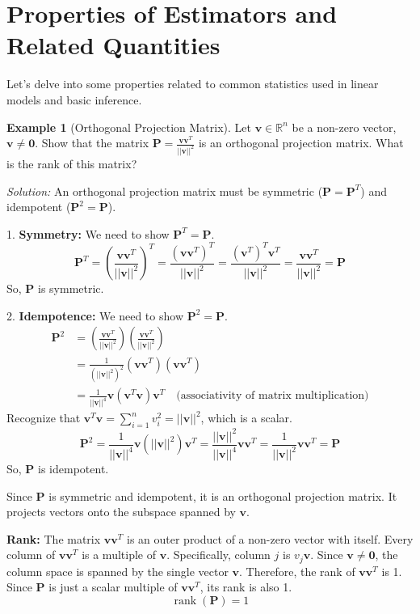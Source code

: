\documentclass[11pt]{article}
\theoremstyle{definition}
\newtheorem{example}[theorem]{Example}
\theoremstyle{remark}
\DeclareMathOperator{\rank}{\operatorname{rank}}
\begin{document}
\section{Properties of Estimators and Related Quantities}

Let's delve into some properties related to common statistics used in linear models and basic inference.

\begin{example}[Orthogonal Projection Matrix] \label{ex:projection}
    Let $\bm{v} \in \mathbb{R}^n$ be a non-zero vector, $\bm{v} \ne \mathbf{0}$. Show that the matrix $\bm{P} = \frac{\bm{v}\bm{v}^T}{||\bm{v}||^2}$ is an orthogonal projection matrix. What is the rank of this matrix?

    \emph{Solution:}
    An orthogonal projection matrix must be symmetric ($\bm{P} = \bm{P}^T$) and idempotent ($\bm{P}^2 = \bm{P}$).
    
    1.  \textbf{Symmetry:} We need to show $\bm{P}^T = \bm{P}$.
        \[ \bm{P}^T = \left( \frac{\bm{v}\bm{v}^T}{||\bm{v}||^2} \right)^T = \frac{(\bm{v}\bm{v}^T)^T}{||\bm{v}||^2} = \frac{(\bm{v}^T)^T \bm{v}^T}{||\bm{v}||^2} = \frac{\bm{v}\bm{v}^T}{||\bm{v}||^2} = \bm{P} \]
        So, $\bm{P}$ is symmetric.
        
    2.  \textbf{Idempotence:} We need to show $\bm{P}^2 = \bm{P}$.
        \begin{align*} \bm{P}^2 &= \left( \frac{\bm{v}\bm{v}^T}{||\bm{v}||^2} \right) \left( \frac{\bm{v}\bm{v}^T}{||\bm{v}||^2} \right) \\ &= \frac{1}{(||\bm{v}||^2)^2} (\bm{v}\bm{v}^T)(\bm{v}\bm{v}^T) \\ &= \frac{1}{||\bm{v}||^4} \bm{v}(\bm{v}^T\bm{v})\bm{v}^T \quad \text{(associativity of matrix multiplication)} \end{align*}
        Recognize that $\bm{v}^T\bm{v} = \sum_{i=1}^n v_i^2 = ||\bm{v}||^2$, which is a scalar.
        \[ \bm{P}^2 = \frac{1}{||\bm{v}||^4} \bm{v}(||\bm{v}||^2)\bm{v}^T = \frac{||\bm{v}||^2}{||\bm{v}||^4} \bm{v}\bm{v}^T = \frac{1}{||\bm{v}||^2} \bm{v}\bm{v}^T = \bm{P} \]
        So, $\bm{P}$ is idempotent.
        
    Since $\bm{P}$ is symmetric and idempotent, it is an orthogonal projection matrix. It projects vectors onto the subspace spanned by $\bm{v}$.

    \textbf{Rank:} The matrix $\bm{v}\bm{v}^T$ is an outer product of a non-zero vector with itself. Every column of $\bm{v}\bm{v}^T$ is a multiple of $\bm{v}$. Specifically, column $j$ is $v_j \bm{v}$. Since $\bm{v} \ne \mathbf{0}$, the column space is spanned by the single vector $\bm{v}$. Therefore, the rank of $\bm{v}\bm{v}^T$ is 1. Since $\bm{P}$ is just a scalar multiple of $\bm{v}\bm{v}^T$, its rank is also 1.
    \[ \rank(\bm{P}) = 1 \]
\end{example}
\end{document}
